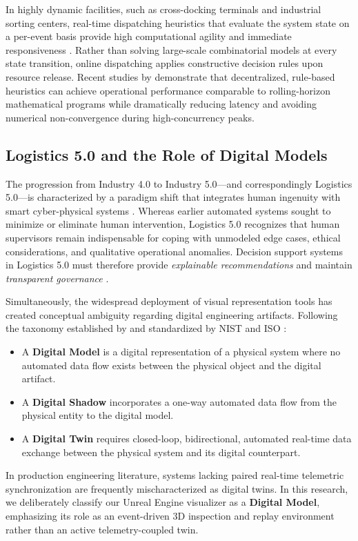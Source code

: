 \documentclass[12pt,a4paper]{article}
\begin{document}
In highly dynamic facilities, such as cross-docking terminals and industrial sorting centers, real-time dispatching heuristics that evaluate the system state on a per-event basis provide high computational agility and immediate responsiveness \parencite{langeDispatchingStrategiesDrayage2018a, wangFlexibleStorageYard2023, fonsecaStabilityApproachCDC2025}. Rather than solving large-scale combinatorial models at every state transition, online dispatching applies constructive decision rules upon resource release. Recent studies by \textcite{torbaliMultiagentbasedRealtimeTruck2023} demonstrate that decentralized, rule-based heuristics can achieve operational performance comparable to rolling-horizon mathematical programs while dramatically reducing latency and avoiding numerical non-convergence during high-concurrency peaks.

\subsection{Logistics 5.0 and the Role of Digital Models}
The progression from Industry 4.0 to Industry 5.0---and correspondingly Logistics 5.0---is characterized by a paradigm shift that integrates human ingenuity with smart cyber-physical systems \parencite{dasilvaIntegrationMachineLearning2023}. Whereas earlier automated systems sought to minimize or eliminate human intervention, Logistics 5.0 recognizes that human supervisors remain indispensable for coping with unmodeled edge cases, ethical considerations, and qualitative operational anomalies. Decision support systems in Logistics 5.0 must therefore provide \emph{explainable recommendations} and maintain \emph{transparent governance} \parencite{mardanehDecisionSupportSystem2021a}.

Simultaneously, the widespread deployment of visual representation tools has created conceptual ambiguity regarding digital engineering artifacts. Following the taxonomy established by \textcite{kritzingerDigitalTwinManufacturing2018} and standardized by NIST \parencite{nistDigitalTwinsEssentialElements2026} and ISO \parencite{isoSmartManufacturingWhitePaper2021}:
\begin{itemize}[leftmargin=1.2cm,itemsep=0pt,topsep=2pt]
  \item A \textbf{Digital Model} is a digital representation of a physical system where no automated data flow exists between the physical object and the digital artifact.
  \item A \textbf{Digital Shadow} incorporates a one-way automated data flow from the physical entity to the digital model.
  \item A \textbf{Digital Twin} requires closed-loop, bidirectional, automated real-time data exchange between the physical system and its digital counterpart.
\end{itemize}
In production engineering literature, systems lacking paired real-time telemetric synchronization are frequently mischaracterized as digital twins. In this research, we deliberately classify our Unreal Engine visualizer as a \textbf{Digital Model}, emphasizing its role as an event-driven 3D inspection and replay environment rather than an active telemetry-coupled twin.
\end{document}
